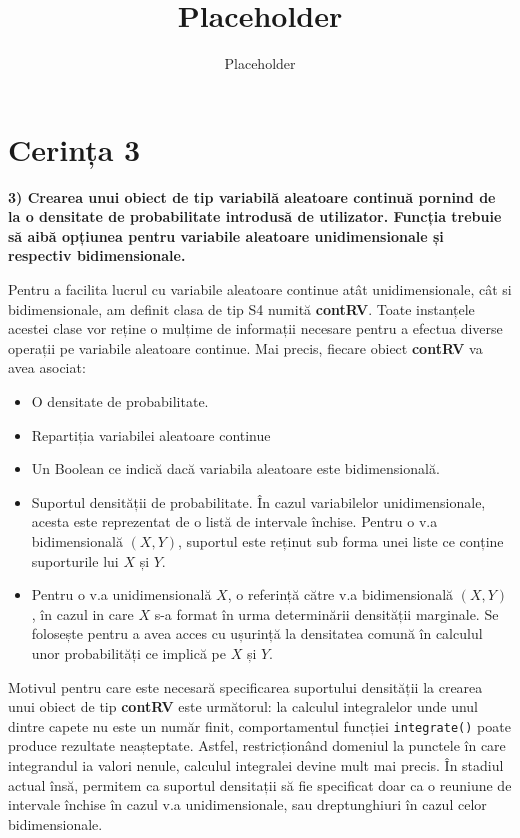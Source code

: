 \documentclass[12pt]{article}
\title{Placeholder}
\author{Placeholder}
\begin{document}
	\section{Cerința 3}
	\textbf{3) Crearea unui obiect de tip variabilă aleatoare continuă pornind de la o densitate de
		probabilitate introdusă de utilizator. Funcția trebuie să aibă opțiunea pentru variabile
		aleatoare unidimensionale și respectiv bidimensionale.}\vspace{5mm}
	
	Pentru a facilita lucrul cu variabile aleatoare continue atât unidimensionale, cât si bidimensionale, am definit clasa de tip S4 numită \textbf{contRV}. Toate instanțele acestei clase vor reține o mulțime de informații necesare pentru a efectua diverse operații pe variabile aleatoare continue. Mai precis, fiecare obiect \textbf{contRV} va avea 
	asociat:
	\begin{itemize}
		\item O densitate de probabilitate.
		\item Repartiția variabilei aleatoare continue
		\item Un Boolean ce indică dacă variabila aleatoare este bidimensională.
		\item Suportul densității de probabilitate. În cazul variabilelor unidimensionale, acesta este reprezentat de o listă de intervale închise. Pentru o v.a bidimensională $(X, Y)$, suportul este reținut sub forma unei liste ce conține suporturile lui $X$ și $Y$.
		\item Pentru o v.a unidimensională $X$, o referință către v.a bidimensională $(X, Y)$, în cazul in care $X$ s-a format în urma determinării densității marginale. Se folosește pentru a avea acces cu ușurință la densitatea comună în calculul unor probabilități ce implică pe $X$ și $Y$. 
	\end{itemize}\vspace*{1\baselineskip} \par
	Motivul pentru care este necesară specificarea suportului densității la crearea unui obiect de tip \textbf{contRV} este următorul: la calculul integralelor unde unul dintre capete nu este un număr finit, comportamentul funcției \lstinline|integrate()| poate produce rezultate neașteptate. Astfel, restricționând domeniul la punctele în care integrandul ia valori nenule, calculul integralei devine mult mai precis.
	În stadiul actual însă, permitem ca suportul densitații să fie specificat doar ca o reuniune de intervale închise în cazul v.a unidimensionale, sau dreptunghiuri în cazul celor bidimensionale.\vspace*{1\baselineskip}\par
	
\end{document}
